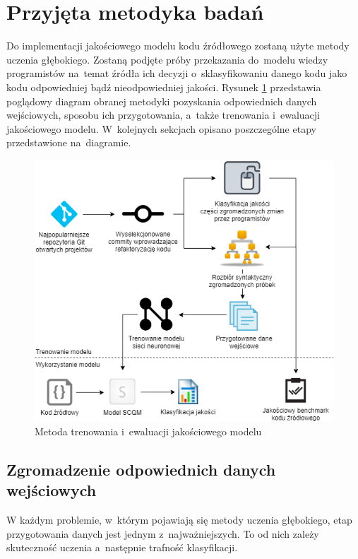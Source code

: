 \documentclass[twoside]{praca}
\begin{document}
\section{Przyjęta metodyka badań}

Do implementacji jakościowego modelu kodu źródłowego zostaną użyte metody uczenia głębokiego. Zostaną podjęte próby przekazania do~modelu wiedzy programistów na~temat źródła ich decyzji o~sklasyfikowaniu danego kodu jako kodu odpowiedniej bądź nieodpowiedniej jakości. Rysunek \ref{fig:proj:diagram} przedstawia poglądowy diagram obranej metodyki pozyskania odpowiednich danych wejściowych, sposobu ich przygotowania, a~także trenowania i~ewaluacji jakościowego modelu. W~kolejnych sekcjach opisano poszczególne etapy przedstawione na~diagramie.

\begin{figure}[h]
\centering
\includegraphics[width=.95\textwidth]{proj/scqm-diagram.png}
\caption{Metoda trenowania i~ewaluacji jakościowego modelu}
\label{fig:proj:diagram}
\end{figure}

\subsection{Zgromadzenie odpowiednich danych wejściowych}
W każdym problemie, w~którym pojawiają się metody uczenia głębokiego, etap przygotowania danych jest jednym z~najważniejszych. To od nich zależy skuteczność uczenia a~następnie trafność klasyfikacji.
\end{document}
